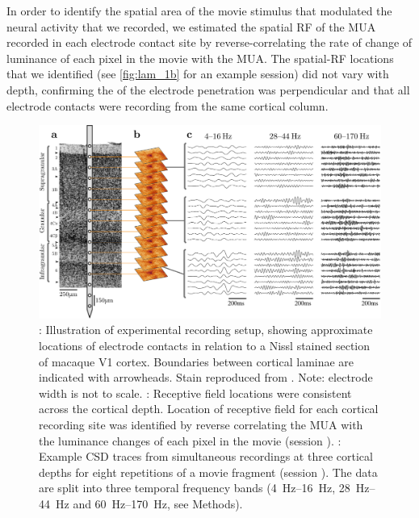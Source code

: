 In order to identify the spatial area of the movie stimulus that modulated the neural activity that we recorded, we estimated the spatial \ac{RF} of the \ac{MUA} recorded in each electrode contact site by reverse-correlating the rate of change of luminance of each pixel in the movie with the \ac{MUA}.
The spatial-\ac{RF} locations that we identified (see \autoref{fig:lam_1b} for an example session) did not vary with depth, confirming the of the electrode penetration was perpendicular and that all electrode contacts were recording from the same cortical column.


\begin{figure}[htbp]
\subfloat{\label{fig:lam_1a}}
\subfloat{\label{fig:lam_1b}}
\subfloat{\label{fig:lam_1c}}
\centering \includegraphics[width=\columnwidth]{paperfigs/fig1.pdf}
%
\caption{
\protect{}: Illustration of experimental recording setup, showing approximate locations of electrode contacts in relation to a Nissl stained section of macaque \ac{V1} cortex.
Boundaries between cortical laminae are indicated with arrowheads.
Stain reproduced from \citet{Tyler1998}.
Note: electrode width is not to scale.
\protect{}: Receptive field locations were consistent across the cortical depth.
Location of receptive field for each cortical recording site was identified by reverse correlating the \ac{MUA} with the luminance changes of each pixel in the movie (session ).
\protect{}: Example \ac{CSD} traces from simultaneous recordings at three cortical depths for eight repetitions of a movie fragment (session ).
The data are split into three temporal frequency bands (\SIrange{4}{16}{Hz}, \SIrange{28}{44}{Hz} and \SIrange{60}{170}{Hz}, see Methods).
}%
\label{fig:lam_1}
%
\end{figure}


